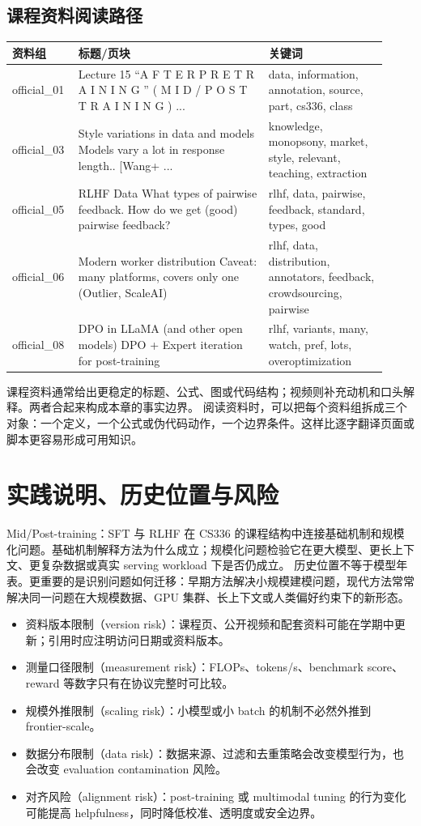 \documentclass[a4paper]{article}
\begin{document}
\subsection{课程资料阅读路径}
\begin{longtable}{p{0.14\linewidth}p{0.48\linewidth}p{0.30\linewidth}}
\toprule
\textbf{资料组} & \textbf{标题/页块} & \textbf{关键词}\\
\midrule
official\_01 & Lecture 15 “A F T E R P R E T R A I N I N G ” ( M I D / P O S T T R A I N I N G ) ... & data, information, annotation, source, part, cs336, class\\
official\_03 & Style variations in data and models Models vary a lot in response length.. [Wang+ ... & knowledge, monopsony, market, style, relevant, teaching, extraction\\
official\_05 & RLHF Data What types of pairwise feedback. How do we get (good) pairwise feedback? & rlhf, data, pairwise, feedback, standard, types, good\\
official\_06 & Modern worker distribution Caveat: many platforms, covers only one (Outlier, ScaleAI) & rlhf, data, distribution, annotators, feedback, crowdsourcing, pairwise\\
official\_08 & DPO in LLaMA (and other open models) DPO + Expert iteration for post-training & rlhf, variants, many, watch, pref, lots, overoptimization\\
\bottomrule
\end{longtable}
课程资料通常给出更稳定的标题、公式、图或代码结构；视频则补充动机和口头解释。两者合起来构成本章的事实边界。
阅读资料时，可以把每个资料组拆成三个对象：一个定义，一个公式或伪代码动作，一个边界条件。这样比逐字翻译页面或脚本更容易形成可用知识。
\section{实践说明、历史位置与风险}
Mid/Post-training：SFT 与 RLHF 在 CS336 的课程结构中连接基础机制和规模化问题。基础机制解释方法为什么成立；规模化问题检验它在更大模型、更长上下文、更复杂数据或真实 serving workload 下是否仍成立。
历史位置不等于模型年表。更重要的是识别问题如何迁移：早期方法解决小规模建模问题，现代方法常常解决同一问题在大规模数据、GPU 集群、长上下文或人类偏好约束下的新形态。
\begin{itemize}
\item 资料版本限制（version risk）：课程页、公开视频和配套资料可能在学期中更新；引用时应注明访问日期或资料版本。
\item 测量口径限制（measurement risk）：FLOPs、tokens/s、benchmark score、reward 等数字只有在协议完整时可比较。
\item 规模外推限制（scaling risk）：小模型或小 batch 的机制不必然外推到 frontier-scale。
\item 数据分布限制（data risk）：数据来源、过滤和去重策略会改变模型行为，也会改变 evaluation contamination 风险。
\item 对齐风险（alignment risk）：post-training 或 multimodal tuning 的行为变化可能提高 helpfulness，同时降低校准、透明度或安全边界。
\end{itemize}
\end{document}

